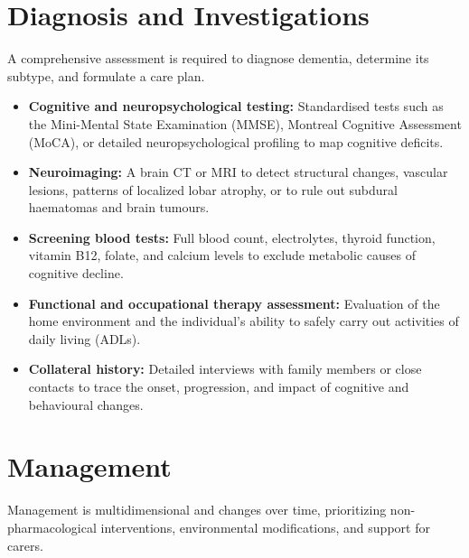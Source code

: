 \section*{Diagnosis and Investigations}
A comprehensive assessment is required to diagnose dementia, determine its subtype, and formulate a care plan.

\begin{itemize}
    \item \textbf{Cognitive and neuropsychological testing:} Standardised tests such as the Mini-Mental State Examination (MMSE), Montreal Cognitive Assessment (MoCA), or detailed neuropsychological profiling to map cognitive deficits.
    \item \textbf{Neuroimaging:} A brain CT or MRI to detect structural changes, vascular lesions, patterns of localized lobar atrophy, or to rule out subdural haematomas and brain tumours.
    \item \textbf{Screening blood tests:} Full blood count, electrolytes, thyroid function, vitamin B12, folate, and calcium levels to exclude metabolic causes of cognitive decline.
    \item \textbf{Functional and occupational therapy assessment:} Evaluation of the home environment and the individual's ability to safely carry out activities of daily living (ADLs).
    \item \textbf{Collateral history:} Detailed interviews with family members or close contacts to trace the onset, progression, and impact of cognitive and behavioural changes.
\end{itemize}

\section*{Management}
Management is multidimensional and changes over time, prioritizing non-pharmacological interventions, environmental modifications, and support for carers.

